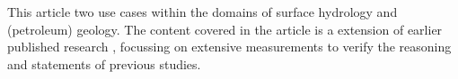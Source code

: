 \documentclass[review]{elsarticle}
\begin{document}

This article  two use cases within the domains of surface hydrology and (petroleum) geology. The content covered in the article is a  extension of earlier published research \cite{Kroehnert2017b}, focussing on extensive measurements to verify the reasoning and statements of previous studies.
\end{document}

